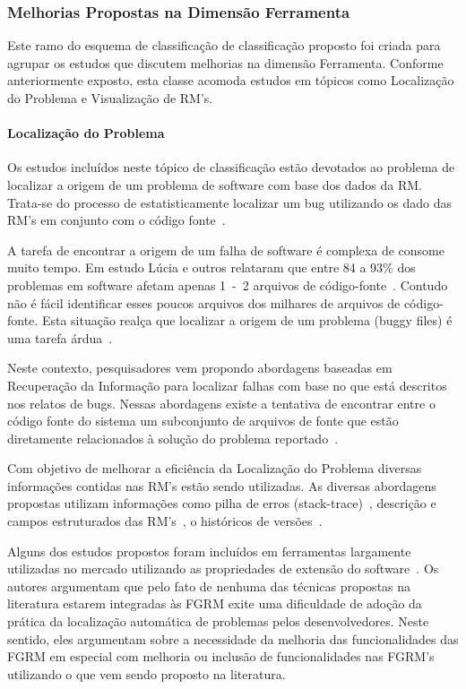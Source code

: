 \subsubsection{Melhorias Propostas na Dimensão Ferramenta}
\label{ssub:melhorias_dim_ferramenta}

Este ramo do esquema de classificação de classificação proposto foi criada para
agrupar os estudos que discutem melhorias na dimensão Ferramenta. Conforme
anteriormente exposto, esta classe acomoda estudos em tópicos como Localização
do Problema e Visualização de RM's.  \paragraph{Localização do Problema} Os
estudos incluídos neste tópico de classificação estão devotados ao problema de
localizar a origem de um problema de software com base dos dados da RM\@.
Trata-se do processo de estatisticamente localizar um bug utilizando os dado das
RM's em conjunto com o código fonte~\cite{Hovemeyer:2004:FBE:1052883.1052895}.

A tarefa de encontrar a origem de um falha de software é complexa de consome
muito tempo. Em estudo Lúcia e outros relataram que entre 84 a 93\% dos
problemas em software afetam apenas 1~-~2 arquivos de
código-fonte~\cite{thung2012faults}. Contudo não é fácil identificar esses
poucos arquivos dos milhares de arquivos de código-fonte. Esta situação realça
que localizar a origem de um problema (buggy files) é uma tarefa
árdua~\cite{Thung:2014:BIT:2635868.2661678}.

Neste contexto, pesquisadores vem propondo abordagens baseadas em Recuperação da
Informação para localizar falhas com base no que está descritos nos relatos de
bugs. Nessas abordagens existe a tentativa de encontrar entre o código fonte do
sistema um subconjunto de arquivos de fonte que estão diretamente relacionados à
solução do problema reportado~\cite{Wong:2014:BBF:2705615.2706096}.

Com objetivo de melhorar a eficiência da Localização do Problema diversas
informações contidas nas RM's estão sendo utilizadas. As diversas abordagens
propostas utilizam informações como pilha de erros
(stack-trace)~\cite{Wong:2014:BBF:2705615.2706096}, descrição e campos
estruturados das RM's~\cite{Thung:2014:BIT:2635868.2661678}, o históricos de
versões~\cite{Bangcharoensap:2012:LSC:2419061.2419428,corley2011recovering,Romo:2015:TAT:2745802.2745833}.

Alguns dos estudos propostos foram incluídos em ferramentas largamente
utilizadas no mercado utilizando as propriedades de extensão do
software~\cite{Thung:2014:BIT:2635868.2661678,corley2011recovering}. Os autores
argumentam que pelo fato de nenhuma das técnicas propostas na literatura estarem
integradas às FGRM exite uma dificuldade de adoção da prática da localização
automática de problemas pelos desenvolvedores. Neste sentido, eles argumentam
sobre a necessidade da melhoria das funcionalidades das FGRM em especial com
melhoria ou inclusão de funcionalidades nas FGRM's utilizando o que vem sendo
proposto na literatura.

